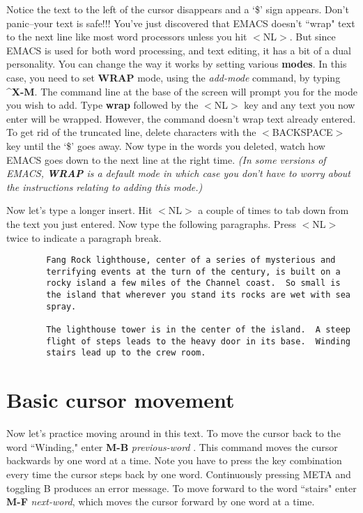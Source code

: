 Notice the text to the left of the cursor disappears and a `\$' sign
appears.  Don't panic--your text is safe!!! You've just discovered
that EMACS doesn't ``wrap" text to the next line like most word
processors unless you hit $<${}NL$>${}.  But since EMACS is used for
both word processing, and text editing, it has a bit of a dual
personality.  You can change  the way it works by setting
various {\bf{}modes}.  In this case, you need to set {\bf{}WRAP} mode,
using the {\it{}add-mode}  command, by typing
{\bf{}\^{}X-M}.  The command line at the base of the screen will
prompt you for the mode you wish to add.  Type {\bf{}wrap} followed by
the $<${}NL$>${} key and any text you now enter will be wrapped.
However, the command doesn't wrap text already entered.  To get rid of
the truncated line, delete characters with the $<${}BACKSPACE$>${} key
until the `\$' goes away.  Now type in the words you deleted, watch
how EMACS goes down to the next line at the right time.  {\it{}(In
some versions of EMACS, {\bf{}WRAP} is a default mode in which case
you don't have to worry about the instructions relating to adding this
mode.)}

Now let's type a longer insert.  Hit $<${}NL$>${} a couple of times to tab
down from the text you just entered.  Now type the following paragraphs.
Press $<${}NL$>${} twice to indicate a paragraph break.

\begin{verbatim}
        Fang Rock lighthouse, center of a series of mysterious and
        terrifying events at the turn of the century, is built on a
        rocky island a few miles of the Channel coast.  So small is
        the island that wherever you stand its rocks are wet with sea
        spray.

        The lighthouse tower is in the center of the island.  A steep
        flight of steps leads to the heavy door in its base.  Winding
        stairs lead up to the crew room.
\end{verbatim}

\section{Basic cursor movement}

Now let's practice moving around in this text.  To move the cursor
back to the word ``Winding," enter {\bf{}M-B} {\it{}previous-word}
.  This command moves the cursor backwards by one
word at a time.  Note you have to press the key combination every time
the cursor steps back by one word.  Continuously pressing META and
toggling B produces an error message.  To move forward to the word
``stairs" enter {\bf{}M-F} {\it{}next-word}, which moves the cursor
forward by one word at a time.

